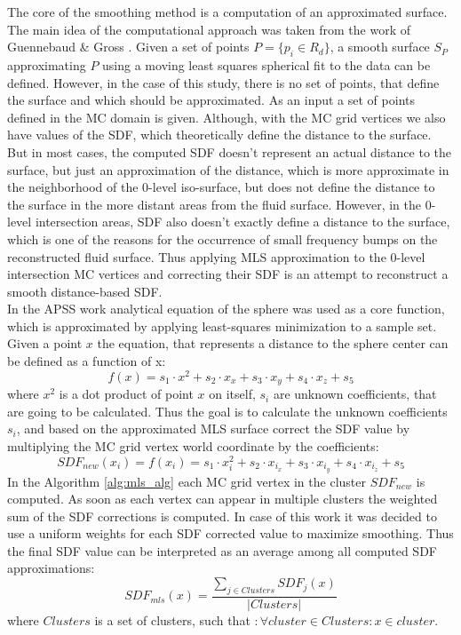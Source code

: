 The core of the smoothing method is a computation of an approximated surface. 
The main idea of the computational approach was taken from the work of Guennebaud \& Gross \cite{Apss}. 
Given a set of points $P = \{p_i \in R_d \}$, a smooth surface $S_P$ approximating $P$ using a moving least squares spherical fit to the data can be defined. However, in the case of this study, there is no set of points, that define the surface and which should be approximated. As an input a set of points defined in the MC domain is given. 
Although, with the MC grid vertices we also have values of the SDF, which theoretically define the distance to the surface. But in most cases, the computed SDF doesn't represent an actual distance to the surface, but just an approximation of the distance, which is more approximate in the neighborhood of the 0-level iso-surface, but does not define the distance to the surface in the more distant areas from the fluid surface. 
However, in the 0-level intersection areas, SDF also doesn't exactly define a distance to the surface, which is one of the reasons for the occurrence of small frequency bumps on the reconstructed fluid surface. Thus applying MLS approximation to the 0-level intersection MC vertices and correcting their SDF is an attempt to reconstruct a smooth distance-based SDF.\\
In the APSS work analytical equation of the sphere was used as a core function, which is approximated by applying least-squares minimization to a sample set. Given a point $x$ the equation, that represents a distance to the sphere center can be defined as a function of x:
\begin{equation}
f(x) = s_1\cdot x^2 + s_2 \cdot x_x + s_3 \cdot x_y + s_4 \cdot x_z + s_5
\end{equation}
where $x^2$ is a dot product of point $x$ on itself, $s_i$ are unknown coefficients, that are going to be calculated. Thus the goal is to calculate the unknown coefficients $s_i$, and based on the approximated MLS surface correct the SDF value by multiplying the MC grid vertex world coordinate by the coefficients:
\begin{equation}
SDF_{new}(x_i) = f(x_i) = s_1\cdot x_i^2 + s_2 \cdot x_{i_x} + s_3 \cdot x_{i_y} + s_4 \cdot x_{i_z} + s_5 \label{eq:sdf_approximation}
\end{equation}
In the Algorithm \ref{alg:mls_alg} each MC grid vertex in the cluster $SDF_{new}$ is computed. As soon as each vertex can appear in multiple clusters the weighted sum of the SDF corrections is computed. In case of this work it was decided to use a uniform weights for each SDF corrected value to maximize smoothing. Thus the final SDF value can be interpreted as an average among all computed SDF approximations:
\begin{equation}
	SDF_{mls}(x) = \dfrac{\sum_{j \in Clusters}{SDF_{j}(x)}}{|Clusters|} \label{eq:sdf_mls_approximation_final}
\end{equation}
where $Clusters$ is a set of clusters, such that $: \forall cluster \in Clusters: x \in cluster$. 

